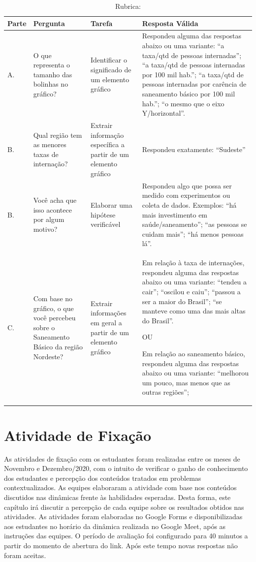\documentclass[
]{book}
\begin{document}
\begin{table}

\caption{\label{tab:quadroimpacto6}Rubrica:}
\centering
\begin{tabular}[t]{l|l|l|l}
\hline
Parte & Pergunta & Tarefa & Resposta Válida\\
\hline
A. & O que representa o tamanho das bolinhas no gráfico? & Identificar o significado de um elemento gráfico & Respondeu alguma das respostas abaixo ou uma variante:
“a taxa/qtd de pessoas internadas”;
“a taxa/qtd de pessoas internadas por 100 mil hab.”;
“a taxa/qtd de pessoas internadas por carência de saneamento básico por 100 mil hab.”;
“o mesmo que o eixo Y/horizontal”.\\
\hline
B. & Qual região tem as menores taxas de internação? & Extrair informação específica a partir de um elemento gráfico & Respondeu exatamente:
“Sudeste”\\
\hline
B. & Você acha que isso acontece por algum motivo? & Elaborar uma hipótese verificável & Respondeu algo que possa ser medido com experimentos ou coleta de dados. Exemplos:
“há mais investimento em saúde/saneamento”;
“as pessoas se cuidam mais”;
“há menos pessoas lá”.\\
\hline
C. & Com base no gráfico, o que você percebeu sobre o Saneamento Básico da região Nordeste? & Extrair informações em geral a partir de um elemento gráfico & Em relação à taxa de internações, respondeu alguma das respostas abaixo ou uma variante:
“tendeu a cair”;
“oscilou e caiu”;
“passou a ser a maior do Brasil”;
“se manteve como uma das mais altas do Brasil”.

OU

Em relação ao saneamento básico, respondeu alguma das respostas abaixo ou uma variante:
“melhorou um pouco, mas menos que as outras regiões”;\\
\hline
\end{tabular}
\end{table}

\hypertarget{atividade-de-fixauxe7uxe3o}{%
\chapter{Atividade de Fixação}\label{atividade-de-fixauxe7uxe3o}}

As atividades de fixação com os estudantes foram realizadas entre os meses de Novembro e Dezembro/2020, com o intuito de verificar o ganho de conhecimento dos estudantes e percepção dos conteúdos tratados em problemas contextualizados. As equipes elaboraram a atividade com base nos conteúdos discutidos nas dinâmicas frente às habilidades esperadas. Desta forma, este capítulo irá discutir a percepção de cada equipe sobre os resultados obtidos nas atividades.
As atividades foram elaboradas no Google Forms e disponibilizadas aos estudantes no horário da dinâmica realizada no Google Meet, após as instruções das equipes. O período de avaliação foi configurado para 40 minutos a partir do momento de abertura do link. Após este tempo novas respostas não foram aceitas.
\end{document}
